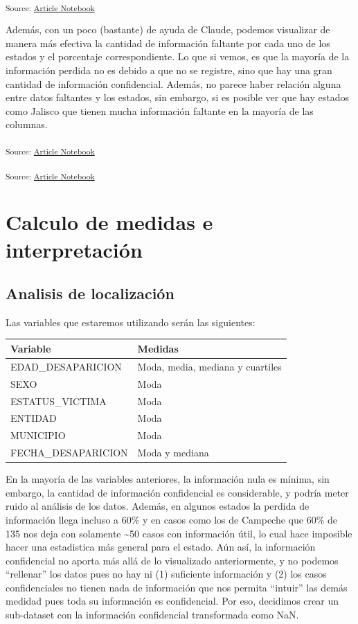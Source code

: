 \documentclass[
]{agujournal2019}
\newcounter{none} %
\begin{document}
\textsubscript{Source:
\href{https://Rou-uu.github.io/pruebaQuarto/index.qmd.html}{Article
Notebook}}

Además, con un poco (bastante) de ayuda de Claude, podemos visualizar de
manera más efectiva la cantidad de información faltante por cada uno de
los estados y el porcentaje correspondiente. Lo que si vemos, es que la
mayoría de la información perdida no es debido a que no se registre,
sino que hay una gran cantidad de información confidencial. Además, no
parece haber relación alguna entre datos faltantes y los estados, sin
embargo, si es posible ver que hay estados como Jalisco que tienen mucha
información faltante en la mayoría de las columnas.

\textsubscript{Source:
\href{https://Rou-uu.github.io/pruebaQuarto/index.qmd.html}{Article
Notebook}}

\textsubscript{Source:
\href{https://Rou-uu.github.io/pruebaQuarto/index.qmd.html}{Article
Notebook}}

\section{Calculo de medidas e
interpretación}\label{calculo-de-medidas-e-interpretaciuxf3n}

\subsection{Analisis de localización}\label{analisis-de-localizaciuxf3n}

Las variables que estaremos utilizando serán las siguientes:

{\def\LTcaptype{none} %
\begin{longtable}[]{@{}ll@{}}
\toprule\noalign{}
Variable & Medidas \\
\midrule\noalign{}
\endhead
\bottomrule\noalign{}
\endlastfoot
EDAD\_DESAPARICION & Moda, media, mediana y cuartiles \\
SEXO & Moda \\
ESTATUS\_VICTIMA & Moda \\
ENTIDAD & Moda \\
MUNICIPIO & Moda \\
FECHA\_DESAPARICION & Moda y mediana \\
\end{longtable}
}

En la mayoría de las variables anteriores, la información nula es
mínima, sin embargo, la cantidad de información confidencial es
considerable, y podría meter ruido al análisis de los datos. Además, en
algunos estados la perdida de información llega incluso a 60\% y en
casos como los de Campeche que 60\% de 135 nos deja con solamente
\textasciitilde50 casos con información útil, lo cual hace imposible
hacer una estadistica más general para el estado. Aún así, la
información confidencial no aporta más allá de lo visualizado
anteriormente, y no podemos ``rellenar'' los datos pues no hay ni (1)
suficiente información y (2) los casos confidenciales no tienen nada de
información que nos permita ``intuir'' las demás medidad pues toda su
información es confidencial. Por eso, decidimos crear un sub-dataset con
la información confidencial transformada como NaN.
\end{document}
